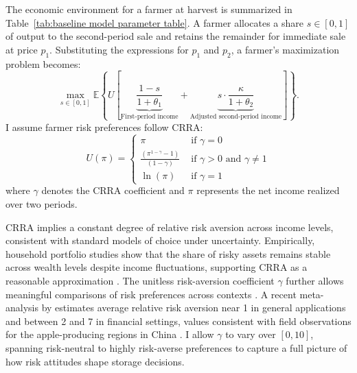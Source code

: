 \noindent The economic environment for a farmer at harvest is summarized in Table~\ref{tab:baseline model parameter table}. A farmer allocates a share $s \in [0,1]$ of output to the second-period sale and retains the remainder for immediate sale at price $p_1$. Substituting the expressions for $p_1$ and $p_{2}$, a farmer's maximization problem becomes:
\begin{equation}
\label{eq:final objective}
\max_{s \in [0,1]} \mathbb{E} \left\{U\left[\underbrace{\frac{1-s}{1+\theta_1}}_{\text{First-period income}} + \underbrace{s \cdot \frac{\kappa}{1+\theta_2}}_{\text{Adjusted second-period income}} \right]\right\}.
\end{equation}
I assume farmer risk preferences follow CRRA:
\begin{equation}
    U(\pi)=\left\{
    \begin{array}{ll}
    \pi & \text { if } \gamma = 0 \\
    \frac{\left(\pi^{1-\gamma}-1\right)}{(1-\gamma)} & \text { if } \gamma > 0 \text { and } \gamma \neq 1 \\
    \ln (\pi) & \text { if } \gamma=1
    \end{array}\right.
\label{eq: CRRA}
\end{equation}
where $\gamma$ denotes the CRRA coefficient and $\pi$ represents the net income realized over two periods. 


CRRA implies a constant degree of relative risk aversion across income levels, consistent with standard models of choice under uncertainty. Empirically, household portfolio studies show that the share of risky assets remains stable across wealth levels despite income fluctuations, supporting CRRA as a reasonable approximation \citep{chiappori2011relative, Berger2020Characterizing, zavala2024unfair}. The unitless risk-aversion coefficient $\gamma$ further allows meaningful comparisons of risk preferences across contexts \citep{Szpiro1986Relative, hardaker2000some}. A recent meta-analysis by \citet{Irsova2025Relative} estimates average relative risk aversion near 1 in general applications and between 2 and 7 in financial settings, values consistent with field observations for the apple-producing regions in China \citep{jin2024losses}. I allow $\gamma$ to vary over $[0,10]$, spanning risk-neutral to highly risk-averse preferences to capture a full picture of how risk attitudes shape storage decisions.

